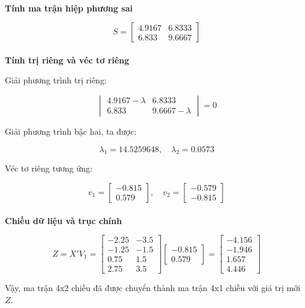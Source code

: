 \paragraph{}\textbf{Tính ma trận hiệp phương sai}

\[
S  =
\begin{bmatrix}
4.9167 & 6.8333 \\
6.833 & 9.6667
\end{bmatrix}
\]


\paragraph{}\textbf{Tính trị riêng và véc tơ riêng}

Giải phương trình trị riêng:

\[
\begin{vmatrix}
4.9167 - \lambda &6.8333  \\
6.833  & 9.6667 - \lambda
\end{vmatrix} = 0
\]

Giải phương trình bậc hai, ta được:

\[
\lambda_1 = 14.5259648 , \quad \lambda_2 = 0.0573
\]

Véc tơ riêng tương ứng:

\[
v_1 =
\begin{bmatrix}
-0.815\\ 0.579
\end{bmatrix}, \quad
v_2 =
\begin{bmatrix}
-0.579\\ -0.815
\end{bmatrix}
\]

\paragraph{}\textbf{Chiếu dữ liệu và trục chính}

\[
Z = X' V_1 =
\begin{bmatrix}
-2.25 & -3.5 \\
-1.25 & -1.5 \\
0.75 & 1.5 \\
2.75 & 3.5
\end{bmatrix}
\begin{bmatrix} -0.815\\ 0.579 \end{bmatrix}
=
\begin{bmatrix}
-4.156 \\
-1.946 \\
1.657 \\
4.446
\end{bmatrix}
\]

Vậy, ma trận 4x2 chiều đã được chuyển thành ma trận 4x1 chiều với giá trị mới \( Z \).

